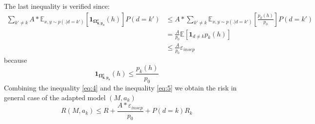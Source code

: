 \documentclass[12pt,a4paper,twoside]{report}
\theoremstyle{definition}
\newcommand{\fyTodo}[1]{\Todo[FY:]{\textcolor{orange}{#1}}}
\begin{document}
The last inequality is verified since:
\begin{equation}
\begin{split}
\displaystyle{\mathop{\sum}_{k' \neq k}} A * \mathbb{E}_{x,y \sim p(.|d=k')} [\mathbf{1}_{\mathbf{\Omega_{k,p_{0}}^{c}}} (h)]P(d=k') &\leq A * \displaystyle{\mathop{\sum}_{k' \neq k}} \mathbb{E}_{x,y \sim p(.|d=k') } [\frac{p_k(h)}{p_0}]P(d=k') \\
		& = \frac{A}{p_0} \mathbb{E}[\mathbf{1}_{d\neq k}p_k(h)] \\
		& \leq \frac{A}{p_0} \mathbb{\varepsilon}_{insep}
\end{split}
\end{equation}
because
$$ \mathbf{1}_{\mathbf{\Omega_{k,p_{0}}^{c}}}(h) \leq \frac{p_k(h)}{p_0} $$
Combining the inequality \ref{eq:4} and the inequality \ref{eq:5} we obtain the risk in general case of the adapted model $(M,a_k)$ $$R(M,a_k) \leq R + \frac{A * \mathbb{\varepsilon}_{insep}}{p_0} + P(d=k)R_k$$

\fyTodo{I sort of buy the equations but then so what ? We should may be compare with non-adaptive ?}
\end{document}
